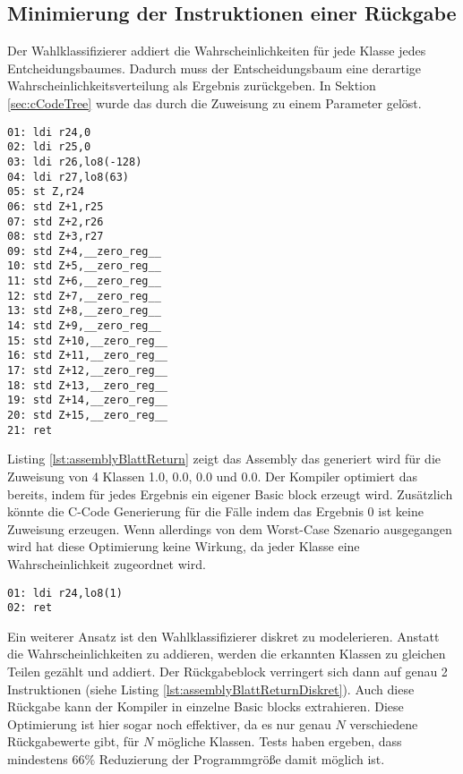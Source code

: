 \subsection{Minimierung der Instruktionen einer Rückgabe}
Der Wahlklassifizierer addiert die Wahrscheinlichkeiten für jede Klasse jedes Entcheidungsbaumes. Dadurch muss der Entscheidungsbaum eine derartige Wahrscheinlichkeitsverteilung als Ergebnis zurückgeben. In
Sektion \ref{sec:cCodeTree} wurde das durch die Zuweisung zu einem Parameter gelöst.
\begin{lstlisting}[label=lst:assemblyBlattReturn,caption={Beispiel des Assemblycodes der Rückgabe der Wahrscheinlichkeitsverteilung eines Entscheidungsbaumes.}]
01: ldi r24,0
02: ldi r25,0
03: ldi r26,lo8(-128)
04: ldi r27,lo8(63)
05: st Z,r24
06: std Z+1,r25
07: std Z+2,r26
08: std Z+3,r27
09: std Z+4,__zero_reg__
10: std Z+5,__zero_reg__
11: std Z+6,__zero_reg__
12: std Z+7,__zero_reg__
13: std Z+8,__zero_reg__
14: std Z+9,__zero_reg__
15: std Z+10,__zero_reg__
16: std Z+11,__zero_reg__
17: std Z+12,__zero_reg__
18: std Z+13,__zero_reg__
19: std Z+14,__zero_reg__
20: std Z+15,__zero_reg__
21: ret
\end{lstlisting}
Listing \ref{lst:assemblyBlattReturn} zeigt das Assembly das generiert wird für die Zuweisung von 4 Klassen 1.0, 0.0, 0.0 und 0.0. Der Kompiler optimiert das bereits, indem für jedes Ergebnis ein eigener
Basic block erzeugt wird. Zusätzlich könnte die C-Code Generierung für die Fälle indem das Ergebnis 0 ist keine Zuweisung erzeugen. Wenn allerdings von dem Worst-Case Szenario ausgegangen wird
hat diese Optimierung keine Wirkung, da jeder Klasse eine Wahrscheinlichkeit zugeordnet wird.
\begin{lstlisting}[label=lst:assemblyBlattReturnDiskret,caption={Beispiel des Assemblycodes der Rückgabe eines diskreten Wahlklassifizierers.}]
01: ldi r24,lo8(1)
02: ret
\end{lstlisting}
Ein weiterer Ansatz ist den Wahlklassifizierer diskret zu modelerieren. Anstatt die Wahrscheinlichkeiten zu addieren, werden die erkannten Klassen zu gleichen Teilen gezählt und addiert. Der Rückgabeblock
verringert sich dann auf genau 2 Instruktionen (siehe Listing \ref{lst:assemblyBlattReturnDiskret}). Auch diese Rückgabe kann der Kompiler in einzelne Basic blocks extrahieren. Diese Optimierung ist hier sogar
noch effektiver, da es nur genau $N$ verschiedene Rückgabewerte gibt, für $N$ mögliche Klassen. Tests haben ergeben, dass mindestens $66\%$ Reduzierung der Programmgröße damit möglich ist.
\newline
